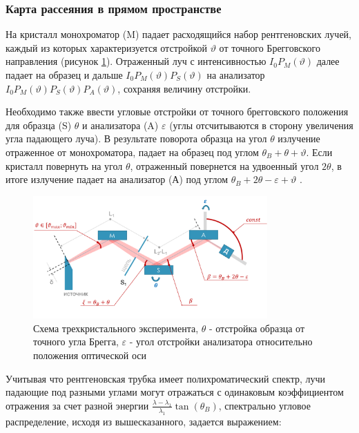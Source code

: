 
\subsubsection{Карта рассеяния в прямом пространстве}

На кристалл монохроматор (M) падает расходящийся набор рентгеновских лучей, каждый из которых характеризуется отстройкой
$\vartheta$ от точного Брегговского направления (рисунок \ref{ris:triple_crystal_schem}). Отраженный луч с интенсивностью
$I_0 P_M(\vartheta)$ далее падает на образец и дальше $I_0 P_M(\vartheta)P_S(\vartheta)$  на анализатор $I_0 P_M(\vartheta)P_S(\vartheta)P_A(\vartheta)$,
сохраняя величину отстройки.

Необходимо также ввести угловые отстройки от точного брегговского положения
для образца (S) $\theta$ и анализатора (A) $\varepsilon$  (углы отсчитываются в сторону увеличения угла падающего луча).
В результате поворота образца на угол  $\theta$ излучение отраженное от монохроматора, падает на образец
под углом $\theta_B+\theta+\vartheta$. Если кристалл повернуть на угол $\theta$, отраженный повернется на удвоенный угол
$2\theta$, в итоге излучение падает на анализатор (А) под углом $\theta_B+2\theta-\varepsilon+\vartheta$ \cite{trd_Bushuev_1997}.
\begin{figure}[H]
  \centering
  \includegraphics[width=0.8\textwidth]{images/triple_crystal_schem.png}
  \caption{Схема трехкристального эксперимента, $\theta$ - отстройка образца от точного угла Брегга,
  $\varepsilon$ - угол отстройки анализатора относительно положения оптической оси}
  \label{ris:triple_crystal_schem}
\end{figure}

Учитывая что рентгеновская трубка имеет полихроматический спектр, лучи падающие под разными углами могут отражаться
с одинаковым коэффициентом отражения за счет разной энергии $\frac{\lambda - \lambda_1}{\lambda_1}\tan(\theta_B)$,
спектрально угловое распределение, исходя из вышесказанного, задается выражением:

